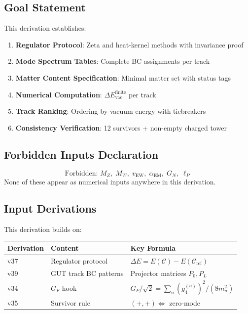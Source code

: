 \documentclass[11pt,a4paper]{article}
\begin{document}
\subsection{Goal Statement}
This derivation establishes:
\begin{enumerate}
    \item \textbf{Regulator Protocol}: Zeta and heat-kernel methods with invariance proof
    \item \textbf{Mode Spectrum Tables}: Complete BC assignments per track
    \item \textbf{Matter Content Specification}: Minimal matter set with status tags
    \item \textbf{Numerical Computation}: $\Delta E_{\text{vac}}^{\text{finite}}$ per track
    \item \textbf{Track Ranking}: Ordering by vacuum energy with tiebreakers
    \item \textbf{Consistency Verification}: 12 survivors + non-empty charged tower
\end{enumerate}

\subsection{Forbidden Inputs Declaration}
\begin{equation}
\label{eq:forbidden}
\boxed{\text{Forbidden: } M_Z,\; M_W,\; v_{\text{EW}},\; \alpha_{\text{EM}},\; G_N,\; \ell_P}
\end{equation}
None of these appear as numerical inputs anywhere in this derivation.

\subsection{Input Derivations}
This derivation builds on:
\begin{center}
\begin{tabular}{lll}
\toprule
Derivation & Content & Key Formula \\
\midrule
v37 & Regulator protocol & $\Delta E = E(\mathcal{C}) - E(\mathcal{C}_{\text{ref}})$ \\
v39 & GUT track BC patterns & Projector matrices $P_0, P_L$ \\
v34 & $G_F$ hook & $G_F/\sqrt{2} = \sum_n (g_4^{(n)})^2/(8m_n^2)$ \\
v35 & Survivor rule & $(+,+) \Leftrightarrow$ zero-mode \\
\bottomrule
\end{tabular}
\end{center}
\end{document}
